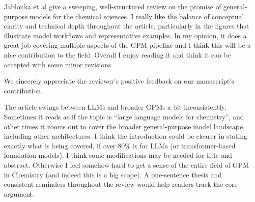 
\begin{point}
Jablonka et al give a sweeping, well-structured review on the promise of general-purpose models for the chemical sciences. I really like the balance of conceptual clarity and technical depth throughout the article, particularly in the figures that illustrate model workflows and representative examples. In my opinion, it does a great job covering multiple aspects of the GPM pipeline and I think this will be a nice contribution to the field. Overall I enjoy reading it and think it can be accepted with some minor revisions.
\end{point}

\begin{reply}
We sincerely appreciate the reviewer's positive feedback on our manuscript's contribution.
\end{reply}

\begin{point}
The article swings between LLMs and broader GPMs a bit inconsistently. Sometimes it reads as if the topic is ``large language models for chemistry'', and other times it zooms out to cover the broader general-purpose model landscape, including other architectures. I think the introduction could be clearer in stating exactly what is being covered, if over 80\% is for LLMs (or transformer-based foundation models), I think some modifications may be needed for title and abstract. Otherwise I feel somehow hard to get a sense of the entire field of GPM in Chemistry (and indeed this is a big scope). A one-sentence thesis and consistent reminders throughout the review would help readers track the core argument.
\end{point}

